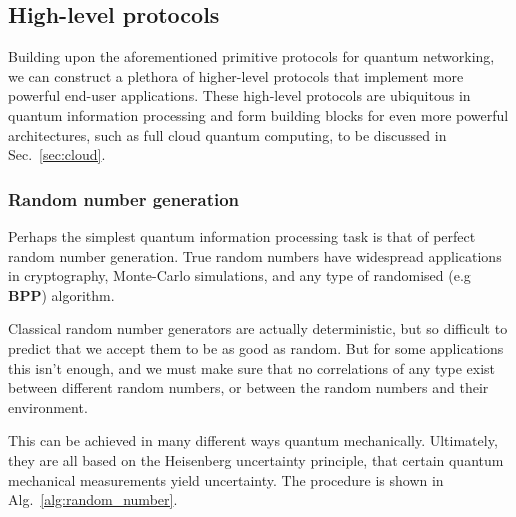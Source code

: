 \documentclass[aps, rmp, twocolumn, amsmath, amssymb, nofootinbib, superscriptaddress, longbibliography, floatfix, table-of-contents, eqsecnum]{revtex4-1}
\begin{document}
%
%

\subsection{High-level protocols} 

Building upon the aforementioned primitive protocols for quantum networking, we can construct a plethora of higher-level protocols that implement more powerful end-user applications. These high-level protocols are ubiquitous in quantum information processing and form building blocks for even more powerful architectures, such as full cloud quantum computing, to be discussed in Sec.~\ref{sec:cloud}.

%
%

\subsubsection{Random number generation} 

Perhaps the simplest quantum information processing task is that of perfect random number generation. True random numbers have widespread applications in cryptography, Monte-Carlo simulations, and any type of randomised (e.g \textbf{BPP}) algorithm.

Classical random number generators are actually deterministic, but so difficult to predict that we accept them to be as good as random. But for some applications this isn't enough, and we must make sure that no correlations of any type exist between different random numbers, or between the random numbers and their environment.

This can be achieved in many different ways quantum mechanically. Ultimately, they are all based on the Heisenberg uncertainty principle, that certain quantum mechanical measurements yield uncertainty. The procedure is shown in Alg.~\ref{alg:random_number}.
\end{document}
